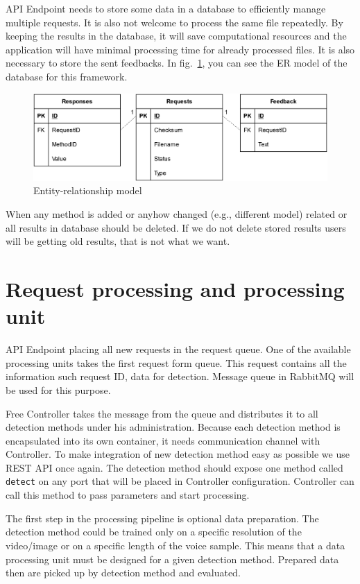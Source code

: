 API Endpoint needs to store some data in a database to efficiently manage multiple requests. It is also not welcome to process the same file repeatedly. By keeping the results in the database, it will save computational resources and the application will have minimal processing time for already processed files. It is also necessary to store the sent feedbacks. In fig.~\ref{fig:framework_architecture_database}, you can see the ER model of the database for this framework.

\begin{figure}[H]
    \centering
    \includegraphics[width=.74\linewidth]{other-fig/framework_architecture_database.png}
    \caption{Entity-relationship model}
    \label{fig:framework_architecture_database}
\end{figure}

When any method is added or anyhow changed (e.g., different model) related or all results in database should be deleted. If we do not delete stored results users will be getting old results, that is not what we want.

\section{Request processing and processing unit}

API Endpoint placing all new requests in the request queue. One of the available processing units takes the first request form queue. This request contains all the information such request ID, data for detection. Message queue in RabbitMQ will be used for this purpose.

Free Controller takes the message from the queue and distributes it to all detection methods under his administration. Because each detection method is encapsulated into its own container, it needs communication channel with Controller. To make integration of new detection method easy as possible we use REST API once again. The detection method should expose one method called \texttt{detect} on any port that will be placed in Controller configuration. Controller can call this method to pass parameters and start processing.

The first step in the processing pipeline is optional data preparation. The detection method could be trained only on a specific resolution of the video/image or on a specific length of the voice sample. This means that a data processing unit must be designed for a given detection method. Prepared data then are picked up by detection method and evaluated.

